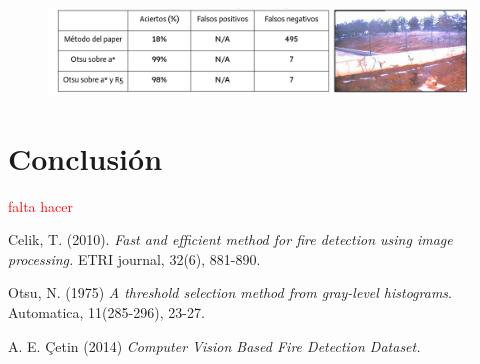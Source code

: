 \documentclass[a4paper]{article}
\begin{document}
\begin{figure}[H]
    \centering
    \includegraphics[width=1\linewidth]{figures/exp_video_4.png}
    \label{fig:exp_video_4}
\end{figure}
 



\section{Conclusión}
\textcolor{red}{falta hacer}


\begin{thebibliography}{9}
Celik, T. (2010).
\textit{Fast and efficient method for fire detection using image processing.} ETRI journal, 32(6), 881-890.

Otsu, N. (1975)
\textit{A threshold selection method from gray-level histograms}. Automatica, 11(285-296), 23-27. 

A. E. Çetin (2014) 
\textit{Computer Vision Based Fire Detection Dataset.}

\end{thebibliography}
\end{document}
